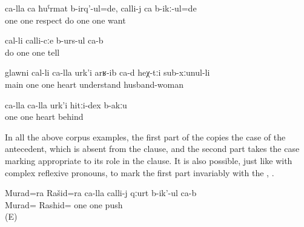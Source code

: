 \begin{exe}
	\ex	\label{ex:‎They respected each other, loved each other}
	\gll	ca-lla	ca	ħuˁrmat	b-irq'-ul=de,	calli-j	ca	b-ikː-ul=de\\
		one	one	respect	do	one	one	want\\
	\glt	{}

	\ex	\label{ex:‎‎They talk to each other what they would do}
	\gll	[b-arq'-ib=el]	cal-li	calli-cːe	b-urs-ul	ca-b\\
		do	one	one	tell	\\
	\glt	{}

	\ex	\label{ex:‎The main point is that they understand each other, the couple}
	\gll	glawni	cal-li	ca-lla	urk'i	arʁ-ib	ca-d	heχ-tːi	sub-xːunul-li\\
		main	one	one	heart	understand			husband-woman\\
	\glt	{}

	\ex	\label{ex:There no bad feelings between each other}
	\gll	ca-lla	ca-lla	urk'i	hitːi-dex	b-akːu\\
		one	one	heart	behind	\\
	\glt	{} 
\end{exe}

In all the above corpus examples, the first part of the  copies the case of the antecedent, which is absent from the clause, and the second part takes the case marking appropriate to its role in the clause. It is also possible, just like with complex reflexive pronouns, to mark the first part invariably with the  , .

\begin{exe}
	\ex	\label{ex:Murad and Rashid push each other.GEN}
	\gll	Murad=ra Rašid=ra ca-lla calli-j qːurt b-ik'-ul ca-b\\
	Murad= Rashid= one	one	push  \\
	\glt	{} (E)
\end{exe}


